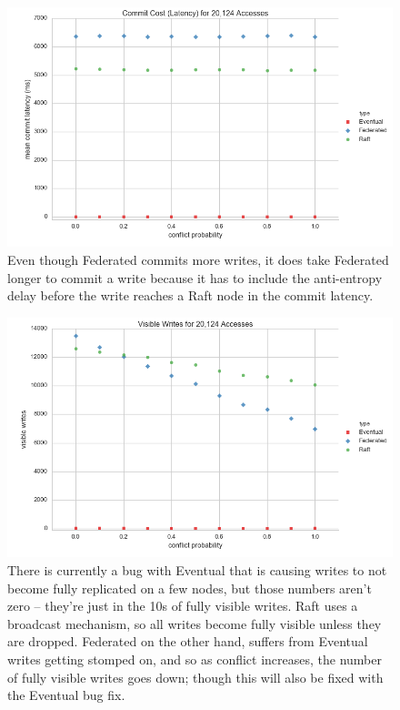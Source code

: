 \documentclass[11pt,letterpaper]{article}
\begin{document}
\begin{figure}[!h]
    \centering
        \includegraphics[width=\textwidth]{figures/commit_latency.png}
        \caption{\textsf{Even though Federated commits more writes, it does take Federated longer to commit a write because it has to include the anti-entropy delay before the write reaches a Raft node in the commit latency.}}
        \label{fig:commit_latency}
\end{figure}

\begin{figure}[!h]
    \centering
        \includegraphics[width=\textwidth]{figures/visible_writes.png}
        \caption{\textsf{There is currently a bug with Eventual that is causing writes to not become fully replicated on a few nodes, but those numbers aren't zero -- they're just in the 10s of fully visible writes. Raft uses a broadcast mechanism, so all writes become fully visible unless they are dropped. Federated on the other hand, suffers from Eventual writes getting stomped on, and so as conflict increases, the number of fully visible writes goes down; though this will also be fixed with the Eventual bug fix.}}
        \label{fig:visible_writes}
\end{figure}
\end{document}

